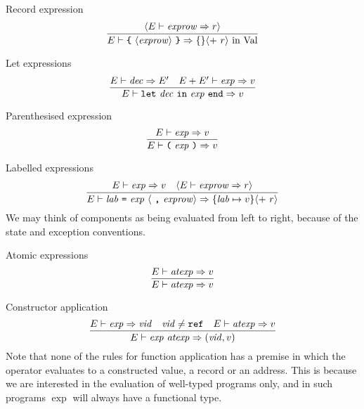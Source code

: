 \begin{inference-rule}{Record expression}
\begin{equation}\label{rule:dynamic-core:recexp}
\vcenter{\infer{\E\ts\lttbrace\ \recexp\ \rttbrace\ra\emptymap
                                  \optional{ +\ \r}\ \In\ \Val}
  {\optional{\E\ts\labexps\ra\r}}}
\end{equation}
\end{inference-rule}

\begin{inference-rule}{Let expressions}
\begin{equation}\label{rule:dynamic-core:let}
\vcenter{\infer{\E\ts\letexp\ra\V}
  {\E\ts\dec\ra\E'
    &\E+\E'\ts\exp\ra\V}}
\end{equation}
\end{inference-rule}

\begin{inference-rule}{Parenthesised expression}
\begin{equation}\label{rule:dynamic-core:}
\vcenter{\infer{\E\ts\parexp\ra\V}
  {\E\ts\exp\ra\V}}
\end{equation}
\end{inference-rule}


\begin{inference-rule}{Labelled expressions}
\begin{equation}\label{rule:dynamic-core:labexps}
\vcenter{\infer{\E\ts\longlabexps\ra\{\lab\mapsto\V\}\optional{ +\ \r}}
    {\E\ts\exp\ra\V
      & \optional{\E\ts\labexps\ra\r}}}
\end{equation}
We may think of components as being evaluated from left to right,
because of the state and exception conventions.
\end{inference-rule}


\begin{inference-rule}{Atomic expressions}
\begin{equation}\label{rule:dynamic-core:atexp}
\vcenter{\infer{\E\ts\atexp\ra\V}{\E\ts\atexp\ra\V}}
\end{equation}
\end{inference-rule}

\begin{inference-rule}{Constructor application}
\begin{equation}\label{rule:dynamic-core:conapp}
\vcenter{\infer{\E\ts\appexp\ra(\vid,\V)}
  {\E\ts\exp\ra\vid
    & \vid\neq\REF
    & \E\ts\atexp\ra\V}}
\end{equation}
Note that none of the rules for function application has a premise
in which the operator evaluates to a constructed value, a record or an
address. This is because we are interested in the evaluation of
well-typed programs only, and in such programs $\exp$ will always have a
functional type.
\end{inference-rule}

